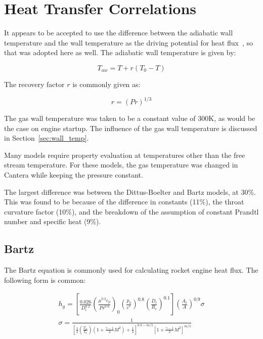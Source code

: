 \documentclass[11pt]{article}
\begin{document}
\section{Heat Transfer Correlations}

It appears to be accepted to use the difference between the adiabatic wall temperature and the wall temperature as the driving potential for heat flux~\cite{huang_modern_1992, bartz_turbulent_1965, grisson_liquid_1991}, so that was adopted here as well. The adiabatic wall temperature is given by:

\begin{equation}
    T_{aw} = T + r(T_0 - T)
\end{equation}

The recovery factor $r$ is commonly given as:

\begin{equation}
    r = (Pr)^{1/3}
\end{equation}

The gas wall temperature was taken to be a constant value of 300K, as would be the case on engine startup. The influence of the gas wall temperature is discussed in Section~\ref{sec:wall_temp}.

Many models require property evaluation at temperatures other than the free stream temperature. For these models, the gas temperature was changed in Cantera while keeping the pressure constant.



The largest difference was between the Dittus-Boelter and Bartz models, at 30\%. This was found to be because of the difference in constants (11\%), the throat curvature factor (10\%), and the breakdown of the assumption of constant Prandtl number and specific heat (9\%).

\subsection{Bartz}


The Bartz equation is commonly used for calculating rocket engine heat flux. The following form is common:

\begin{equation}
    \label{equation:bartz}
    \begin{split}
         h_g = \left[ \frac{0.026}{D_t^{0.2}} \left( \frac{\mu^{0.2} c_p}{{Pr}^{0.6}} \right)_{0} \left( \frac{p_0}{c^*} \right)^{0.8} \left( \frac{D_t}{R_c} \right)^{0.1} \right] \left( \frac{A_t}{A} \right)^{0.9} \sigma \\
         \sigma = \frac{1}{\left[ \frac{1}{2} \left( \frac{T_{w}}{T_0} \right) \left( 1 + \frac{\gamma - 1}{2} M^2 \right) + \frac{1}{2}\right]^{0.8-m/5} \left[ 1 + \frac{\gamma - 1}{2} M^2 \right]^{m/5}}
    \end{split}
\end{equation}
\end{document}
